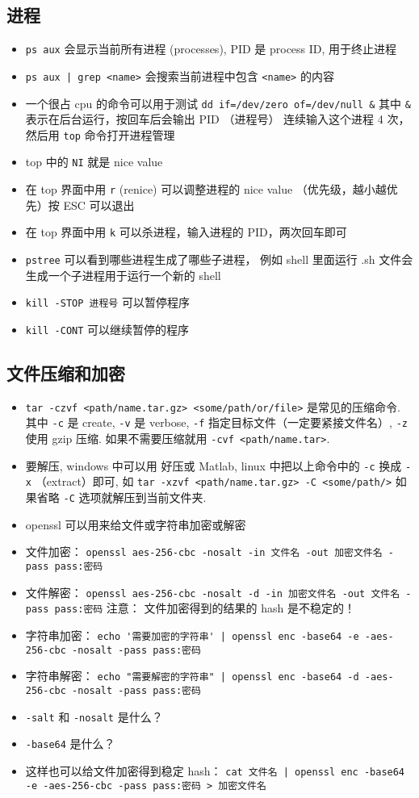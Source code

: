 \subsection{进程}
\begin{itemize}
\item \verb`ps aux` 会显示当前所有进程 (processes), PID 是 process ID, 用于终止进程
\item \verb`ps aux | grep <name>` 会搜索当前进程中包含 \verb`<name>` 的内容
\item 一个很占 cpu 的命令可以用于测试
\verb`dd if=/dev/zero of=/dev/null &`
其中 \verb`&` 表示在后台运行，按回车后会输出 PID （进程号）
连续输入这个进程 4 次， 然后用 \verb`top` 命令打开进程管理
\item top 中的 \verb`NI` 就是 nice value
\item 在 top 界面中用 \verb`r` (renice) 可以调整进程的 nice value （优先级，越小越优先）按 ESC 可以退出
\item 在 top 界面中用 \verb`k` 可以杀进程，输入进程的 PID，两次回车即可
\item \verb`pstree` 可以看到哪些进程生成了哪些子进程， 例如 shell 里面运行 .sh 文件会生成一个子进程用于运行一个新的 shell
\item \verb`kill -STOP 进程号` 可以暂停程序
\item \verb`kill -CONT` 可以继续暂停的程序
\end{itemize}

\subsection{文件压缩和加密}
\begin{itemize}
\item \verb`tar -czvf <path/name.tar.gz> <some/path/or/file>` 是常见的压缩命令. 其中 \verb`-c` 是 create, \verb`-v` 是 verbose, \verb`-f` 指定目标文件（一定要紧接文件名）, \verb`-z` 使用 gzip 压缩. 如果不需要压缩就用 \verb`-cvf <path/name.tar>`.
\item 要解压, windows 中可以用 好压或 Matlab, linux 中把以上命令中的 \verb`-c` 换成 \verb`-x` （extract）即可, 如 \verb`tar -xzvf <path/name.tar.gz> -C <some/path/>` 如果省略 \verb`-C` 选项就解压到当前文件夹.
\item openssl 可以用来给文件或字符串加密或解密
\item 文件加密： \verb`openssl aes-256-cbc -nosalt -in 文件名 -out 加密文件名 -pass pass:密码`
\item 文件解密： \verb`openssl aes-256-cbc -nosalt -d -in 加密文件名 -out 文件名 -pass pass:密码`
注意： 文件加密得到的结果的 hash 是不稳定的！
\item 字符串加密： \verb`echo '需要加密的字符串' | openssl enc -base64 -e -aes-256-cbc -nosalt -pass pass:密码`
\item 字符串解密： \verb`echo "需要解密的字符串" | openssl enc -base64 -d -aes-256-cbc -nosalt -pass pass:密码`
\item \verb`-salt` 和 \verb`-nosalt` 是什么？
\item \verb`-base64` 是什么？
\item 这样也可以给文件加密得到稳定 hash： \verb`cat 文件名 | openssl enc -base64 -e -aes-256-cbc -pass pass:密码 > 加密文件名`
\end{itemize}

